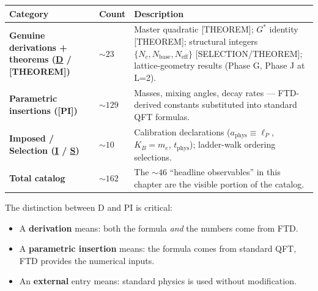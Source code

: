 \documentclass[
  11pt,
  letterpaper,
  twoside,
  openright]{book}
\providecommand{\tightlist}{%
  \setlength{\itemsep}{0pt}\setlength{\parskip}{0pt}}
\begin{document}
\begin{longtable}[]{@{}
  >{\raggedright\arraybackslash}p{}
  >{\raggedright\arraybackslash}p{}
  >{\raggedright\arraybackslash}p{}@{}}
\toprule\noalign{}
\begin{minipage}[b]{\linewidth}\raggedright
Category
\end{minipage} & \begin{minipage}[b]{\linewidth}\raggedright
Count
\end{minipage} & \begin{minipage}[b]{\linewidth}\raggedright
Description
\end{minipage} \\
\midrule\noalign{}
\endhead
\bottomrule\noalign{}
\endlastfoot
\textbf{Genuine derivations + theorems (\hyperref[d]{D} /
{[}THEOREM{]})} & \(\sim 23\) & Master quadratic {[}THEOREM{]}; \(G^*\)
identity {[}THEOREM{]}; structural integers
\(\{N_c, N_\mathrm{base}, N_\mathrm{eff}\}\) {[}SELECTION/THEOREM{]};
lattice-geometry results (Phase G, Phase J at L=2). \\
\textbf{Parametric insertions ({[}PI{]})} & \(\sim 129\) & Masses,
mixing angles, decay rates --- FTD-derived constants substituted into
standard QFT formulas. \\
\textbf{Imposed / Selection (\hyperref[i]{I} / \hyperref[s]{S})} &
\(\sim 10\) & Calibration declarations
(\(a_\mathrm{phys} \equiv \ell_P\), \(K_B = m_e\), \(t_\mathrm{phys}\));
ladder-walk ordering selections. \\
\textbf{Total catalog} & \(\sim 162\) & The \(\sim 46\) ``headline
observables'' in this chapter are the visible portion of the catalog. \\
\end{longtable}

The distinction between D and PI is critical:

\begin{itemize}
\tightlist
\item
  A \textbf{derivation} means: both the formula \emph{and} the numbers
  come from FTD.
\item
  A \textbf{parametric insertion} means: the formula comes from standard
  QFT, FTD provides the numerical inputs.
\item
  An \textbf{external} entry means: standard physics is used without
  modification.
\end{itemize}
\end{document}
